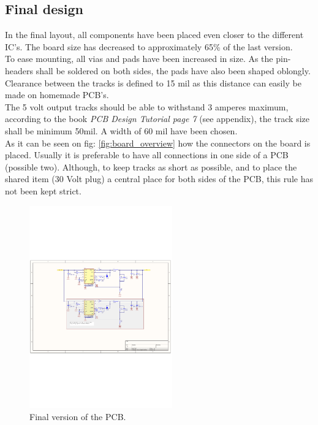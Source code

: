 \subsection{Final design}
In the final layout, all components have been placed even closer to the different IC's. The board size has decreased to approximately 65\% of the last version. 
\\ To ease mounting, all vias and pads have been increased in size. As the pin-headers shall be soldered on both sides, the pads have also been shaped oblongly. Clearance between the tracks is defined to 15 mil as this distance can easily be made on homemade PCB's. 
\\ The 5 volt output tracks should be able to withstand 3 amperes maximum, according to the book \textit{PCB Design Tutorial page 7} (see appendix), the track size shall be minimum 50mil. A width of 60 mil have been chosen. 
\\ As it can be seen on fig: \ref{fig:board_overview} how the connectors on the board is placed. Usually it is preferable to have all connections in one side of a PCB (possible two). Although, to keep tracks as short as possible, and to place the shared item (30 Volt plug) a central place for both sides of the PCB, this rule has not been kept strict.



\begin{figure}[H]
	\begin{centering}
		 \includegraphics[width=0.55\textwidth,page=3,angle=0]{images/SIG60_v0_4}
		\caption{Final version of the PCB.}
	\end{centering}
\end{figure}


